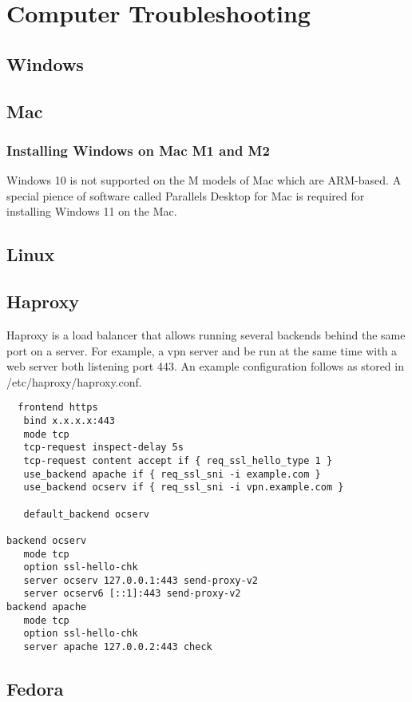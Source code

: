 \documentclass{article}
\begin{document}
\section{Computer Troubleshooting}
\subsection{Windows}

\subsection{Mac}
\subsubsection{Installing Windows on Mac M1 and M2}
Windows 10 is not supported on the M models of Mac which are ARM-based. A special pience of software called Parallels Desktop for Mac is required for installing Windows 11 on the Mac.

\subsection{Linux}

\subsection{Haproxy}
Haproxy is a load balancer that allows running several backends behind the 
same port on a server. For example, a vpn server and be run at the same 
time with a web server both listening port 443. An example configuration 
follows as stored in /etc/haproxy/haproxy.conf.
\begin{verbatim}
  frontend https
   bind x.x.x.x:443
   mode tcp
   tcp-request inspect-delay 5s
   tcp-request content accept if { req_ssl_hello_type 1 }
   use_backend apache if { req_ssl_sni -i example.com }
   use_backend ocserv if { req_ssl_sni -i vpn.example.com }

   default_backend ocserv

backend ocserv
   mode tcp
   option ssl-hello-chk
   server ocserv 127.0.0.1:443 send-proxy-v2
   server ocserv6 [::1]:443 send-proxy-v2
backend apache
   mode tcp
   option ssl-hello-chk
   server apache 127.0.0.2:443 check
\end{verbatim}

\subsection{Fedora}
\end{document}
